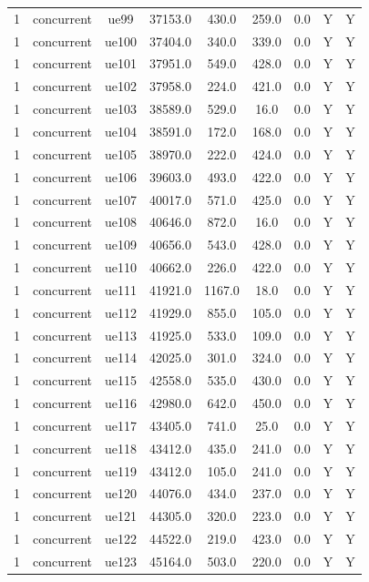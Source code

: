 \begin{table}[ht]
\begin{tabular}{|c|c|c|c|c|c|c|c|c|}
1 & concurrent & ue99 & 37153.0 & 430.0 & 259.0 & 0.0 & Y & Y \\
1 & concurrent & ue100 & 37404.0 & 340.0 & 339.0 & 0.0 & Y & Y \\
1 & concurrent & ue101 & 37951.0 & 549.0 & 428.0 & 0.0 & Y & Y \\
1 & concurrent & ue102 & 37958.0 & 224.0 & 421.0 & 0.0 & Y & Y \\
1 & concurrent & ue103 & 38589.0 & 529.0 & 16.0 & 0.0 & Y & Y \\
1 & concurrent & ue104 & 38591.0 & 172.0 & 168.0 & 0.0 & Y & Y \\
1 & concurrent & ue105 & 38970.0 & 222.0 & 424.0 & 0.0 & Y & Y \\
1 & concurrent & ue106 & 39603.0 & 493.0 & 422.0 & 0.0 & Y & Y \\
1 & concurrent & ue107 & 40017.0 & 571.0 & 425.0 & 0.0 & Y & Y \\
1 & concurrent & ue108 & 40646.0 & 872.0 & 16.0 & 0.0 & Y & Y \\
1 & concurrent & ue109 & 40656.0 & 543.0 & 428.0 & 0.0 & Y & Y \\
1 & concurrent & ue110 & 40662.0 & 226.0 & 422.0 & 0.0 & Y & Y \\
1 & concurrent & ue111 & 41921.0 & 1167.0 & 18.0 & 0.0 & Y & Y \\
1 & concurrent & ue112 & 41929.0 & 855.0 & 105.0 & 0.0 & Y & Y \\
1 & concurrent & ue113 & 41925.0 & 533.0 & 109.0 & 0.0 & Y & Y \\
1 & concurrent & ue114 & 42025.0 & 301.0 & 324.0 & 0.0 & Y & Y \\
1 & concurrent & ue115 & 42558.0 & 535.0 & 430.0 & 0.0 & Y & Y \\
1 & concurrent & ue116 & 42980.0 & 642.0 & 450.0 & 0.0 & Y & Y \\
1 & concurrent & ue117 & 43405.0 & 741.0 & 25.0 & 0.0 & Y & Y \\
1 & concurrent & ue118 & 43412.0 & 435.0 & 241.0 & 0.0 & Y & Y \\
1 & concurrent & ue119 & 43412.0 & 105.0 & 241.0 & 0.0 & Y & Y \\
1 & concurrent & ue120 & 44076.0 & 434.0 & 237.0 & 0.0 & Y & Y \\
1 & concurrent & ue121 & 44305.0 & 320.0 & 223.0 & 0.0 & Y & Y \\
1 & concurrent & ue122 & 44522.0 & 219.0 & 423.0 & 0.0 & Y & Y \\
1 & concurrent & ue123 & 45164.0 & 503.0 & 220.0 & 0.0 & Y & Y \\

\end{tabular}
\end{table}
